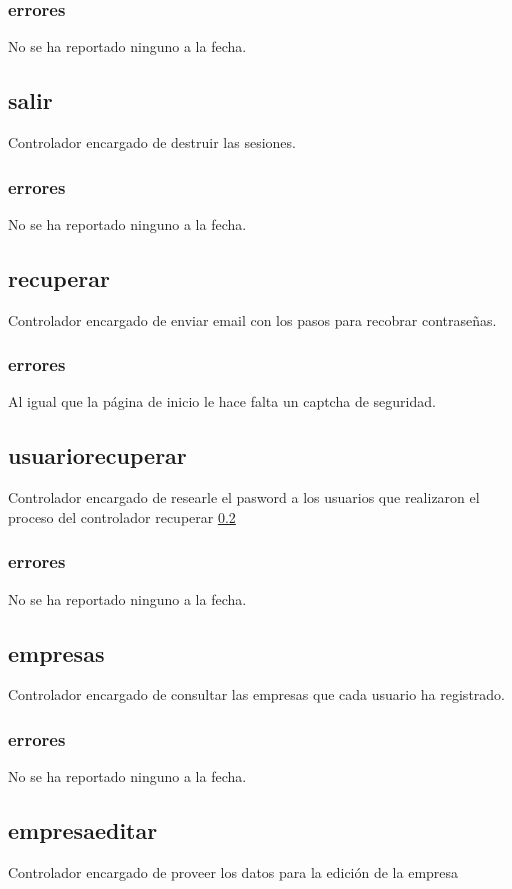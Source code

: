 \documentclass[10pt,a4paper]{book}
\begin{document}
	\subsubsection{errores}
	No se ha reportado ninguno a la fecha.
		
	\subsection{salir}
	Controlador encargado de destruir las sesiones.
	\subsubsection{errores}
	No se ha reportado ninguno a la fecha.
	
	\subsection{recuperar}\label{recuperar}
	Controlador encargado de enviar email con los pasos para recobrar contraseñas.
	\subsubsection{errores}
	Al igual que la página de inicio le hace falta un captcha de seguridad.
	
	\subsection{usuariorecuperar}
	Controlador encargado de researle el pasword a los usuarios que realizaron el proceso del controlador  recuperar \ref{recuperar}
	\subsubsection{errores}
	No se ha reportado ninguno a la fecha.
	
	\subsection{empresas}
	Controlador encargado de consultar las empresas que cada usuario ha registrado.
	\subsubsection{errores}
	No se ha reportado ninguno a la fecha.
	
	\subsection{empresaeditar}
	Controlador encargado de proveer los datos para la edición de la empresa
\end{document}
